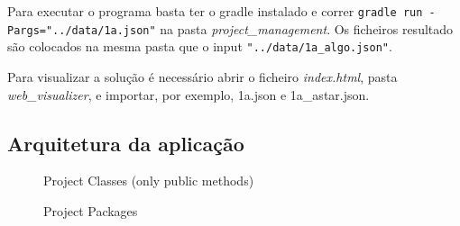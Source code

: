 \documentclass[a4paper,11pt]{article}
\begin{document}
Para executar o programa basta ter o gradle instalado e correr \texttt{gradle run -Pargs="../data/1a.json"} na pasta \textit{project\_management}. Os ficheiros resultado são colocados na mesma pasta que o input \texttt{"../data/1a_{{algo}}.json"}.

Para visualizar a solução é necessário abrir o ficheiro \textit{index.html}, pasta \textit{web\_visualizer}, e importar, por exemplo, 1a.json e 1a\_astar.json.

\subsection{Arquitetura da aplicação}

\begin{figure}[H]
	\centering
	\caption{Project Classes (only public methods)}
	\label{fig:classes}
\end{figure}

\begin{figure}[H]
	\centering
	\caption{Project Packages}
	\label{fig:packages}
\end{figure}
\end{document}
